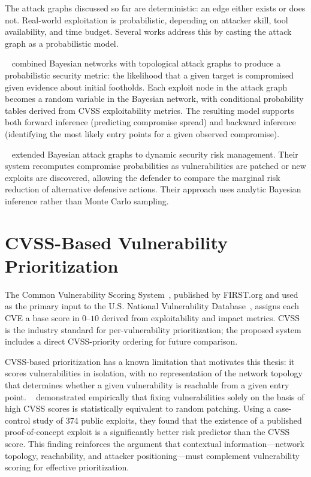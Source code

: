 The attack graphs discussed so far are deterministic: an edge either exists or does not. Real-world exploitation is probabilistic, depending on attacker skill, tool availability, and time budget. Several works address this by casting the attack graph as a probabilistic model.

\citeauthor{frigault08}~\cite{frigault08} combined Bayesian networks with topological attack graphs to produce a probabilistic security metric: the likelihood that a given target is compromised given evidence about initial footholds. Each exploit node in the attack graph becomes a random variable in the Bayesian network, with conditional probability tables derived from CVSS exploitability metrics. The resulting model supports both forward inference (predicting compromise spread) and backward inference (identifying the most likely entry points for a given observed compromise).

\citeauthor{poolsappasit12}~\cite{poolsappasit12} extended Bayesian attack graphs to dynamic security risk management. Their system recomputes compromise probabilities as vulnerabilities are patched or new exploits are discovered, allowing the defender to compare the marginal risk reduction of alternative defensive actions. Their approach uses analytic Bayesian inference rather than Monte Carlo sampling.

\section{CVSS-Based Vulnerability Prioritization}

The Common Vulnerability Scoring System~\cite{cvss31}, published by FIRST.org and used as the primary input to the U.S. National Vulnerability Database~\cite{nvd}, assigns each CVE a base score in $0$--$10$ derived from exploitability and impact metrics. CVSS is the industry standard for per-vulnerability prioritization; the proposed system includes a direct CVSS-priority ordering for future comparison.

CVSS-based prioritization has a known limitation that motivates this thesis: it scores vulnerabilities in isolation, with no representation of the network topology that determines whether a given vulnerability is reachable from a given entry point. \citeauthor{allodi14}~\cite{allodi14} demonstrated empirically that fixing vulnerabilities solely on the basis of high CVSS scores is statistically equivalent to random patching. Using a case-control study of 374 public exploits, they found that the existence of a published proof-of-concept exploit is a significantly better risk predictor than the CVSS score. This finding reinforces the argument that contextual information---network topology, reachability, and attacker positioning---must complement vulnerability scoring for effective prioritization.

